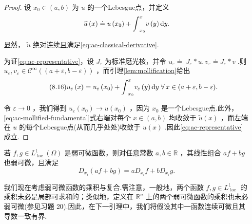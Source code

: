 \begin{proof}
设 ${x}_{0} \in  ( a,b)$ 为 $u$ 的一个Lebesgue点，并定义
\[
\widetilde{u}\left( x\right)  \doteq  u\left( {x}_{0}\right)  + {\int }_{{x}_{0}}^{x}v\left( y\right) {\mathop{}\!\mathrm{d} y}.
\]

显然， $\widetilde{u}$ 绝对连续且满足\eqref{eq:ac-classical-derivative}.

为证\eqref{eq:ac-representative}，设 ${J}_{\varepsilon }$ 为标准磨光核，并令 ${u}_{\varepsilon } \doteq \; {J}_{\varepsilon } * u,{v}_{\varepsilon } \doteq  {J}_{\varepsilon } * v$ .则 ${u}_{\varepsilon },{v}_{\varepsilon } \in  {\mathcal{C}}^{\infty }\left( {( a + \varepsilon ,b - \varepsilon ) }\right)$ ，而引理\ref{lem:mollification}给出
\begin{equation}\tag{8.16}\label{eq:ac-mollified-fundamental}
{u}_{\varepsilon }\left( x\right)  = {u}_{\varepsilon }\left( {x}_{0}\right)  + {\int }_{{x}_{0}}^{x}{v}_{\varepsilon }\left( y\right) {\mathop{}\!\mathrm{d} y}\;\forall\,x \in  ( a + \varepsilon ,b - \varepsilon ) .
\end{equation}

令 $\varepsilon  \rightarrow  0$ ，我们得到 ${u}_{\varepsilon }\left( {x}_{0}\right)  \rightarrow  u\left( {x}_{0}\right)$ ，因为 ${x}_{0}$ 是一个Lebesgue点.此外，\eqref{eq:ac-mollified-fundamental}式右端对每个 $x \in  ( a,b)$ 均收敛于 $\widetilde{u}\left( x\right)$ ，而左端在 $u$ 的每个Lebesgue点(从而几乎处处)收敛于 $u\left( x\right)$ .因此\eqref{eq:ac-representative}成立.
\end{proof}
\begin{property}[弱可微函数]
若 $f,g \in  {L}_{\text{ loc }}^{1}\left( \Omega \right)$ 是弱可微函数，则对任意常数 $a,b \in  \mathbb{R}$ ，其线性组合 ${af} + {bg}$ 也弱可微，且满足
\begin{equation}\tag{8.17}\label{eq:weak-derivative-linearity}
{D}_{{x}_{i}}\left( {{af} + {bg}}\right)  = a{D}_{{x}_{i}}f + b{D}_{{x}_{i}}g.
\end{equation}
\end{property}



我们现在考虑弱可微函数的乘积与复合.需注意，一般地，两个函数 $f,g \in  {L}_{\text{ loc }}^{1}$ 的乘积未必是局部可求和的；类似地，定义在 ${\mathbb{R}}^{n}$ 上的两个弱可微函数的乘积也未必弱可微(参见习题 20).因此，在下一引理中，我们将假设其中一函数连续可微且其导数一致有界.

